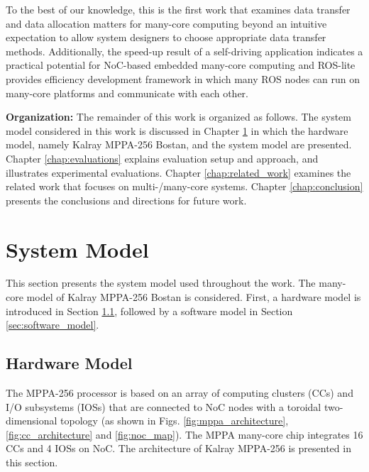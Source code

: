 To the best of our knowledge, this is the first work that examines data transfer and data allocation matters for many-core computing beyond an intuitive expectation to allow system designers to choose appropriate data transfer methods.
Additionally, the speed-up result of a self-driving application indicates a practical potential for NoC-based embedded many-core computing and ROS-lite provides efficiency development framework in which many ROS nodes can run on many-core platforms and communicate with each other.

\textbf{Organization:}
The remainder of this work is organized as follows.
The system model considered in this work is discussed in Chapter \ref{chap:system_model} in which the hardware model, namely Kalray MPPA-256 Bostan, and the system model are presented.
Chapter \ref{chap:evaluations} explains evaluation setup and approach, and illustrates experimental evaluations.
Chapter \ref{chap:related_work} examines the related work that focuses on multi-/many-core systems.
Chapter \ref{chap:conclusion} presents the conclusions and directions for future work.


\chapter{System Model}
\label{chap:system_model}
This section presents the system model used throughout the work.
The many-core model of Kalray MPPA-256 Bostan is considered.
First, a hardware model is introduced in Section \ref{sec:hardware_model}, followed by a software model in Section \ref{sec:software_model}.

\section{Hardware Model}
\label{sec:hardware_model}
The MPPA-256 processor is based on an array of computing clusters (CCs) and I/O subsystems (IOSs) that are connected to NoC nodes with a toroidal two-dimensional topology 
(as shown in Figs. \ref{fig:mppa_architecture}, \ref{fig:cc_architecture} and \ref{fig:noc_map}).
The MPPA many-core chip integrates 16 CCs and 4 IOSs on NoC.
The architecture of Kalray MPPA-256 is presented in this section.

